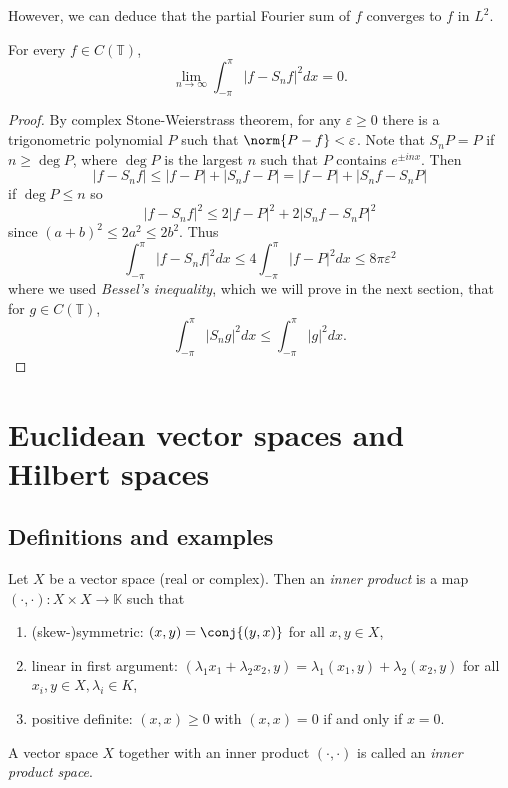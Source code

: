 \documentclass[a4paper]{article}
\newcommand{\K}{{\mathbb{K}}} %
\begin{document}
However, we can deduce that the partial Fourier sum of \(f\) converges to \(f\) in \(L^2\).

\begin{proposition}
  For every \(f \in C(\mathbb T)\),
  \[
    \lim_{n \to \infty} \int_{-\pi}^\pi |f - S_nf|^2 dx = 0.
  \]
\end{proposition}

\begin{proof}
  By complex Stone-Weierstrass theorem, for any \(\varepsilon \geq 0\) there is a trigonometric polynomial \(P\) such that \(\norm{P - f} < \varepsilon\). Note that \(S_nP = P\) if \(n \geq \deg P\), where \(\deg P\) is the largest \(n\) such that \(P\) contains \(e^{\pm inx}\). Then
  \[
    |f - S_nf| \leq |f - P| + |S_nf - P| = |f - P| + |S_nf - S_n P|
  \]
  if \(\deg P \leq n\) so
  \[
    |f - S_nf|^2 \leq 2 |f - P|^2 + 2 |S_nf - S_nP|^2
  \]
  since \((a + b)^2 \leq 2a^2 \leq 2b^2\). Thus
  \[
    \int_{-\pi}^\pi |f - S_nf|^2 dx
    \leq 4 \int_{-\pi}^\pi |f - P|^2 dx
    \leq 8\pi \varepsilon^2
   \]
   where we used \emph{Bessel's inequality}, which we will prove in the next section, that for \(g \in C(\mathbb T)\),
   \[
     \int_{-\pi}^\pi |S_ng|^2 dx \leq \int_{-\pi}^\pi |g|^2 dx.
   \]
\end{proof}

\section{Euclidean vector spaces and Hilbert spaces}

\subsection{Definitions and examples}

\begin{definition}
  Let \(X\) be a vector space (real or complex). Then an \emph{inner product} is a map \((\cdot, \cdot): X \times X \to \K\) such that
  \begin{enumerate}
  \item (skew-)symmetric: \((x, y) = \conj{(y, x)}\) for all \(x, y \in X\),
  \item linear in first argument: \((\lambda_1x_1 + \lambda_2x_2, y) = \lambda_1(x_1, y) + \lambda_2(x_2, y)\) for all \(x_i, y \in X, \lambda_i \in K\),
  \item positive definite: \((x, x) \geq 0\) with \((x, x) = 0\) if and only if \(x = 0\).
  \end{enumerate}

  A vector space \(X\) together with an inner product \((\cdot, \cdot)\) is called an \emph{inner product space}.
\end{definition}
\end{document}
